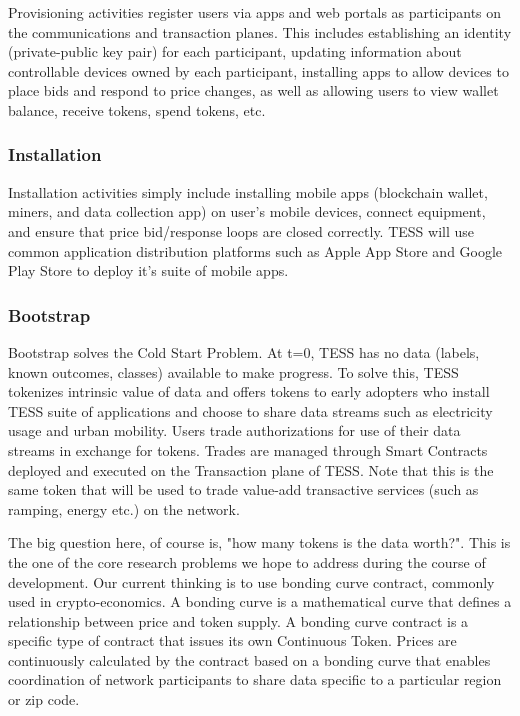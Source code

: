 \documentclass[10pt,twocolumn]{article}
\begin{document}
Provisioning activities register users via apps and web portals as participants on the communications and transaction planes. This includes establishing an identity (private-public key pair) for each participant, updating information about controllable devices owned by each participant, installing apps to allow devices to place bids and respond to price changes, as well as allowing users to view wallet balance, receive tokens, spend tokens, etc. 

\subsubsection{Installation}

Installation activities simply include installing mobile apps (blockchain wallet, miners, and data collection app) on user's mobile devices, connect equipment, and ensure that price bid/response loops are closed correctly. TESS will use common application distribution platforms such as Apple App Store and Google Play Store to deploy it's suite of mobile apps.  

\subsubsection{Bootstrap}

Bootstrap solves the Cold Start Problem. At t=0, TESS has no data (labels, known outcomes, classes) available to make progress. To solve this, TESS tokenizes intrinsic value of data and offers tokens to early adopters who install TESS suite of applications and choose to share data streams such as electricity usage and urban mobility. Users trade authorizations for use of their data streams in exchange for tokens. Trades are managed through Smart Contracts deployed and executed on the Transaction plane of TESS. Note that this is the same token that will be used to trade value-add transactive services (such as ramping, energy etc.) on the network. 

The big question here, of course is, "how many tokens is the data worth?". This is the one of the core research problems we hope to address during the course of development. Our current thinking is to use bonding curve contract, commonly used in crypto-economics. A bonding curve is a mathematical curve that defines a relationship between price and token supply. A bonding curve contract is a specific type of contract that issues its own Continuous Token. Prices are continuously calculated by the contract based on a bonding curve that enables coordination of network participants to share data specific to a particular region or zip code. 
\end{document}
